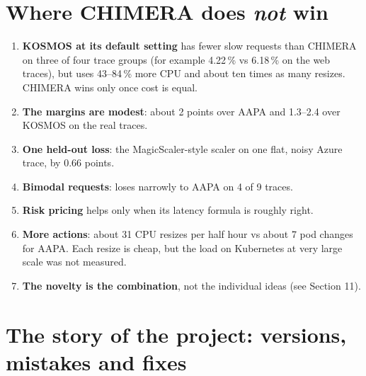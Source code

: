 \documentclass[11pt,a4paper]{article}
\begin{document}
\section{Where CHIMERA does \emph{not} win}

\begin{honest}
\begin{enumerate}
\item \textbf{KOSMOS at its default setting} has fewer slow requests than CHIMERA on three
of four trace groups (for example 4.22\,\% vs 6.18\,\% on the web traces), but uses
43--84\,\% more CPU and about ten times as many resizes. CHIMERA wins only once cost is
equal.
\item \textbf{The margins are modest}: about 2 points over AAPA and 1.3--2.4 over KOSMOS on
the real traces.
\item \textbf{One held-out loss}: the MagicScaler-style scaler on one flat, noisy Azure
trace, by 0.66 points.
\item \textbf{Bimodal requests}: loses narrowly to AAPA on 4 of 9 traces.
\item \textbf{Risk pricing} helps only when its latency formula is roughly right.
\item \textbf{More actions}: about 31 CPU resizes per half hour vs about 7 pod changes for
AAPA. Each resize is cheap, but the load on Kubernetes at very large scale was not
measured.
\item \textbf{The novelty is the combination}, not the individual ideas (see Section 11).
\end{enumerate}
\end{honest}

\section{The story of the project: versions, mistakes and fixes}
\end{document}
